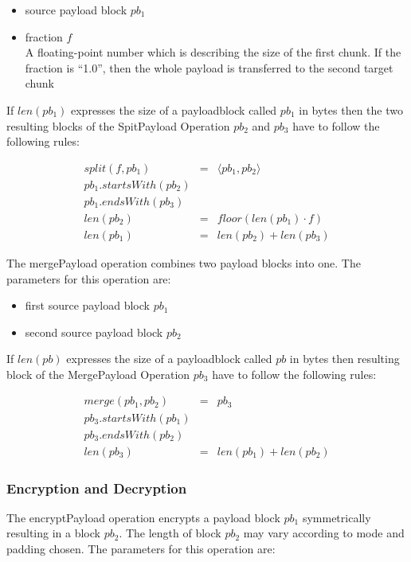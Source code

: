 \documentclass[10pt,journal,compsoc]{IEEEtran}
\begin{document}
\begin{itemize}
	\item source payload block $pb_1$
	\item fraction $f$\\
	A floating-point number which is describing the size of the first chunk. If the fraction is ``1.0'', then the whole payload is transferred to the second target chunk
\end{itemize}

If $len(pb_1)$ expresses the size of a payloadblock called $pb_1$ in bytes then the two resulting blocks of the SpitPayload Operation $pb_2$ and $pb_3$ have to follow the following rules:

\begin{eqnarray}
split(f, pb_1) & = &\langle pb_1, pb_2 \rangle\\
pb_1.startsWith(pb_2)\\
pb_1.endsWith(pb_3)\\
len(pb_2) & = & floor(len(pb_1)\cdot f)\\
len(pb_1) & = & len(pb_2) + len(pb_3)
\end{eqnarray}

The mergePayload operation combines two payload blocks into one. The parameters for this operation are:

\begin{itemize}
	\item first source payload block $pb_1$
	\item second source payload block $pb_2$
\end{itemize}

If $len(pb)$ expresses the size of a payloadblock called $pb$ in bytes then resulting block of the MergePayload Operation $pb_3$ have to follow the following rules:

\begin{eqnarray}
merge(pb_1, pb_2) & = & pb_3 \\
pb_3.startsWith(pb_1)\\
pb_3.endsWith(pb_2)\\
len(pb_3) & = & len(pb_1) + len(pb_2)
\end{eqnarray}

\subsubsection{Encryption and Decryption}
The encryptPayload operation encrypts a payload block $pb_1$ symmetrically resulting in a block $pb_2$. The length of block $pb_2$ may vary according to mode and padding chosen. The parameters for this operation are:
\end{document}
